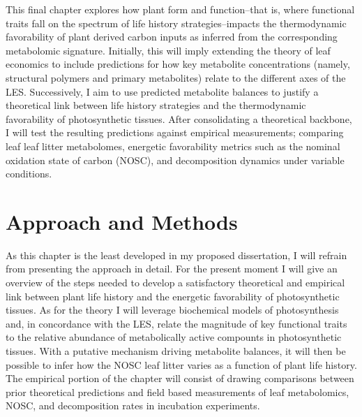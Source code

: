 
This final chapter explores how plant form and function--that is, where functional traits fall on the spectrum of life history strategies--impacts the thermodynamic favorability of plant derived carbon inputs as inferred from the corresponding metabolomic signature. Initially, this will imply extending the theory of leaf economics to include predictions for how key metabolite concentrations (namely, structural polymers and primary metabolites) relate to the different axes of the LES. Successively, I aim to use predicted metabolite balances to justify a theoretical link between life history strategies and the thermodynamic favorability of photosynthetic tissues. After consolidating a theoretical backbone, I will test the resulting predictions against empirical measurements; comparing leaf leaf litter metabolomes, energetic favorability metrics such as the nominal oxidation state of carbon (NOSC), and decomposition dynamics under variable conditions. 

\section{Approach and Methods}


As this chapter is the least developed in my proposed dissertation, I will refrain from presenting the approach in detail. For the present moment I will give an overview of the steps needed to develop a satisfactory theoretical and empirical link between plant life history and the energetic favorability of photosynthetic tissues. As for the theory I will leverage biochemical models of photosynthesis and, in concordance with the LES, relate the magnitude of key functional traits to the relative abundance of metabolically active compounts in photosynthetic tissues. With a putative mechanism driving metabolite balances, it will then be possible to infer how the NOSC leaf litter varies as a function of plant life history. The empirical portion of the chapter will consist of drawing comparisons between prior theoretical predictions and field based measurements of leaf metabolomics, NOSC, and decomposition rates in incubation experiments.

